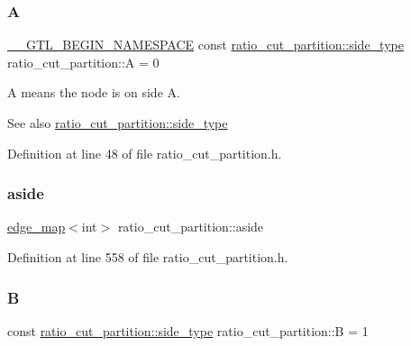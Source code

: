 \subsubsection{\texorpdfstring{A}{A}}
{\footnotesize\ttfamily \mbox{\hyperlink{_g_t_l_8h_a2d9f24096ac60918452dd51f32b64aa9}{\+\_\+\+\_\+\+G\+T\+L\+\_\+\+B\+E\+G\+I\+N\+\_\+\+N\+A\+M\+E\+S\+P\+A\+CE}} const \mbox{\hyperlink{classratio__cut__partition_ace53442bd0c1e21fbf00858ec6f6b456}{ratio\+\_\+cut\+\_\+partition\+::side\+\_\+type}} ratio\+\_\+cut\+\_\+partition\+::A = 0\hspace{0.3cm}{\ttfamily [static]}}

{\ttfamily A} means the node is on side A.

\begin{DoxySeeAlso}{See also}
\mbox{\hyperlink{classratio__cut__partition_ace53442bd0c1e21fbf00858ec6f6b456}{ratio\+\_\+cut\+\_\+partition\+::side\+\_\+type}} 
\end{DoxySeeAlso}


Definition at line 48 of file ratio\+\_\+cut\+\_\+partition.\+h.

\mbox{\label{classratio__cut__partition_a112bfcfb9d05d5bbdeb29576a61399e1}} 
\subsubsection{\texorpdfstring{aside}{aside}}
{\footnotesize\ttfamily \mbox{\hyperlink{classedge__map}{edge\+\_\+map}}$<$int$>$ ratio\+\_\+cut\+\_\+partition\+::aside\hspace{0.3cm}{\ttfamily [protected]}}



Definition at line 558 of file ratio\+\_\+cut\+\_\+partition.\+h.

\mbox{\label{classratio__cut__partition_adf075987228d8adc7950d5b1ba332daa}} 
\subsubsection{\texorpdfstring{B}{B}}
{\footnotesize\ttfamily const \mbox{\hyperlink{classratio__cut__partition_ace53442bd0c1e21fbf00858ec6f6b456}{ratio\+\_\+cut\+\_\+partition\+::side\+\_\+type}} ratio\+\_\+cut\+\_\+partition\+::B = 1\hspace{0.3cm}{\ttfamily [static]}}

